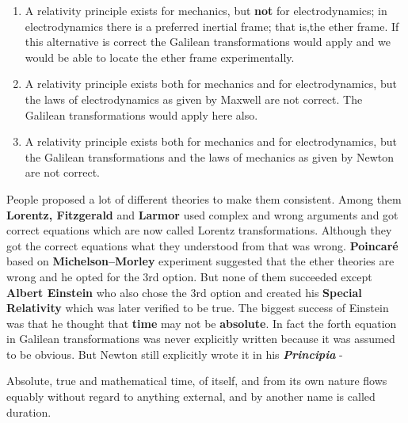 \documentclass[12pt,a4paper]{article}
\numberwithin{table}{section}
\numberwithin{figure}{section}
\numberwithin{equation}{section}
\theoremstyle{remark}
\theoremstyle{definition}
\begin{document}
\begin{enumerate}
  \item A relativity principle exists for mechanics, but \textbf{not} for electrodynamics; in electrodynamics there is a preferred inertial frame; that is,the ether frame. If this alternative is correct the Galilean transformations would apply and we would be able to locate the ether frame 
experimentally.

  \item A relativity principle exists both for mechanics and for electrodynamics, but the laws of electrodynamics as given by Maxwell are not 
correct. The Galilean transformations 
would apply here also.
  \item A relativity principle exists both for mechanics and for electrodynamics, but the Galilean transformations and the laws of mechanics as given by Newton are not correct. 

\end{enumerate}
People proposed a lot of different theories to make them consistent. Among them \textbf{Lorentz, Fitzgerald} and \textbf{Larmor} used complex and wrong arguments and got correct equations which are now called Lorentz transformations. Although they got the correct equations what they understood from that was wrong. \textbf{Poincaré} based on \textbf{Michelson–Morley} experiment suggested that the ether theories are wrong and he opted for the 3rd option. But none of them succeeded except  \textbf{Albert Einstein} who also chose the 3rd option and created his  \textbf{Special Relativity} which was later verified to be true. The biggest success of Einstein was that he thought that  \textbf{time} may not be  \textbf{absolute}. In fact the forth equation in Galilean transformations was never explicitly written because it was assumed to be obvious. But Newton still explicitly wrote it in his \textbf{\textit{Principia}} -
\begin{displayquote}
Absolute, true and mathematical time, of itself, and from its own nature flows equably without regard to anything external, and by another name is called duration.
\end{displayquote}
\end{document}
